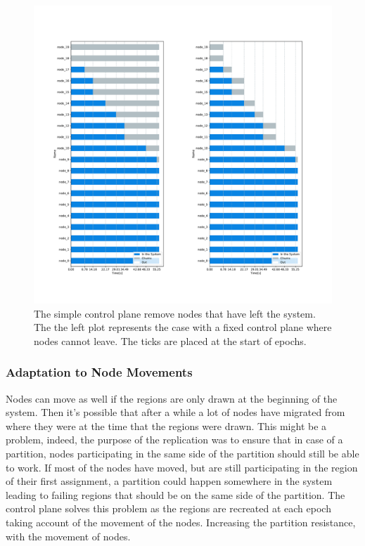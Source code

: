 \documentclass[a4paper,11pt,oneside]{report}
\begin{document}
\begin{figure}[!h] 
\centering
\includegraphics[width=450pt]{figures/ChurnSubplots}
\caption{The simple control plane remove nodes that have left the system. The
  the left plot represents the case with a fixed control plane where nodes cannot leave. The ticks are placed at the start of epochs.}
  \label{fig:churn-comparision}
\end{figure}

\subsubsection{Adaptation to Node Movements}
Nodes can move as well if the regions are only drawn at the beginning of the
system. Then it's possible that after a while a lot of nodes have migrated from
where they were at the time that the regions were drawn. This might be a
problem, indeed, the purpose of the replication was to ensure that in case of a
partition, nodes participating in the same side of the partition should still
be able to work. If most of the nodes have moved, but are still participating
in the region of their first assignment, a partition could happen somewhere in
the system leading to failing regions that should be on the same side of the
partition. The control plane solves this problem as the regions are recreated at
each epoch taking account of the movement of the nodes. Increasing the
partition resistance, with the movement of nodes.
\end{document}
